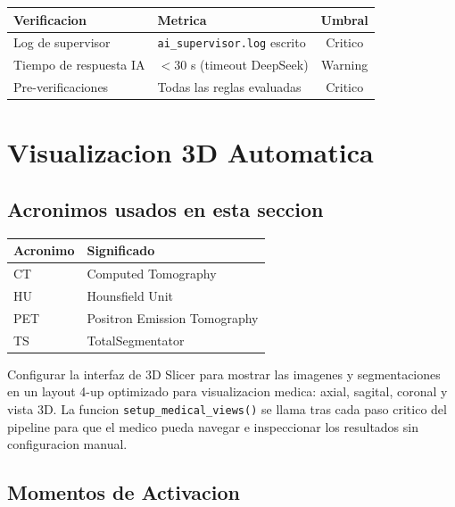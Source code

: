 \documentclass[12pt,a4paper]{article}
\begin{document}
\begin{table}[H]
\centering
\begin{tabular}{llc}
\toprule
\textbf{Verificacion} & \textbf{Metrica} & \textbf{Umbral} \\
\midrule
Log de supervisor & \texttt{ai\_supervisor.log} escrito & Critico \\
Tiempo de respuesta IA & $< 30$ s (timeout DeepSeek) & Warning \\
Pre-verificaciones & Todas las reglas evaluadas & Critico \\
\bottomrule
\end{tabular}
\end{table}

\newpage

\section{Visualizacion 3D Automatica}
\label{sec:vis}

\subsection*{Acronimos usados en esta seccion}
\begin{tabular}{ll}
\toprule
\textbf{Acronimo} & \textbf{Significado} \\
\midrule
CT & Computed Tomography \\
HU & Hounsfield Unit \\
PET & Positron Emission Tomography \\
TS & TotalSegmentator \\
\bottomrule
\end{tabular}

Configurar la interfaz de 3D Slicer para mostrar las imagenes y segmentaciones en un layout
4-up optimizado para visualizacion medica: axial, sagital, coronal y vista 3D. La funcion
\texttt{setup\_medical\_views()} se llama tras cada paso critico del pipeline para que el
medico pueda navegar e inspeccionar los resultados sin configuracion manual.

\subsection{Momentos de Activacion}
\end{document}
